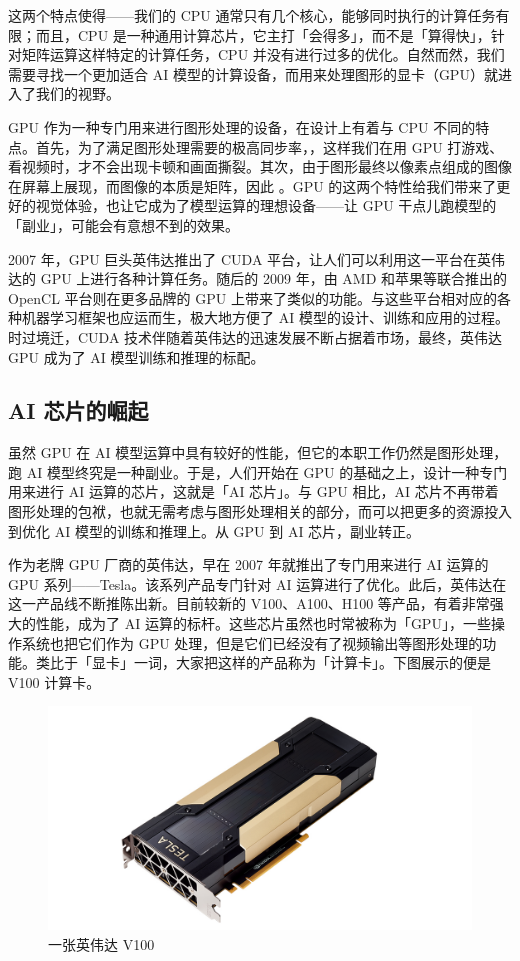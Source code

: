 这两个特点使得——我们的 CPU 通常只有几个核心，能够同时执行的计算任务有限；而且，CPU 是一种通用计算芯片，它主打「会得多」，而不是「算得快」，针对矩阵运算这样特定的计算任务，CPU 并没有进行过多的优化。自然而然，我们需要寻找一个更加适合 AI 模型的计算设备，而用来处理图形的显卡（GPU）就进入了我们的视野。

GPU 作为一种专门用来进行图形处理的设备，在设计上有着与 CPU 不同的特点。首先，为了满足图形处理需要的极高同步率，，这样我们在用 GPU 打游戏、看视频时，才不会出现卡顿和画面撕裂。其次，由于图形最终以像素点组成的图像在屏幕上展现，而图像的本质是矩阵，因此 。GPU 的这两个特性给我们带来了更好的视觉体验，也让它成为了模型运算的理想设备——让 GPU 干点儿跑模型的「副业」，可能会有意想不到的效果。

2007 年，GPU 巨头英伟达推出了 CUDA 平台，让人们可以利用这一平台在英伟达的 GPU 上进行各种计算任务。随后的 2009 年，由 AMD 和苹果等联合推出的 OpenCL 平台则在更多品牌的 GPU 上带来了类似的功能。与这些平台相对应的各种机器学习框架也应运而生，极大地方便了 AI 模型的设计、训练和应用的过程。时过境迁，CUDA 技术伴随着英伟达的迅速发展不断占据着市场，最终，英伟达 GPU 成为了 AI 模型训练和推理的标配。

\subsection{AI 芯片的崛起}

虽然 GPU 在 AI 模型运算中具有较好的性能，但它的本职工作仍然是图形处理，跑 AI 模型终究是一种副业。于是，人们开始在 GPU 的基础之上，设计一种专门用来进行 AI 运算的芯片，这就是「AI 芯片」。与 GPU 相比，AI 芯片不再带着图形处理的包袱，也就无需考虑与图形处理相关的部分，而可以把更多的资源投入到优化 AI 模型的训练和推理上。从 GPU 到 AI 芯片，副业转正。

作为老牌 GPU 厂商的英伟达，早在 2007 年就推出了专门用来进行 AI 运算的 GPU 系列——Tesla。该系列产品专门针对 AI 运算进行了优化。此后，英伟达在这一产品线不断推陈出新。目前较新的 V100、A100、H100 等产品，有着非常强大的性能，成为了 AI 运算的标杆。这些芯片虽然也时常被称为「GPU」，一些操作系统也把它们作为 GPU 处理，但是它们已经没有了视频输出等图形处理的功能。类比于「显卡」一词，大家把这样的产品称为「计算卡」。下图展示的便是 V100 计算卡。

\begin{figure}[htb!]
  \centering
  \includegraphics[width=.7\textwidth]{assets/surpass/V100.jpg}
  \caption{一张英伟达 V100}
  \label{fig:V100}
\end{figure}

